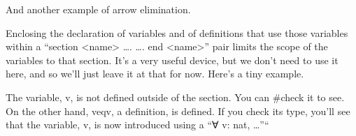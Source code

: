 \documentclass[letterpaper,10pt,english]{sphinxmanual}
\begin{document}
\begin{sphinxVerbatim}[commandchars=\\\{\}]
         
      
         
         
\end{sphinxVerbatim}

And another example of arrow elimination.

\begin{sphinxVerbatim}[commandchars=\\\{\}]
         
             
\end{sphinxVerbatim}

Enclosing the declaration of variables and of definitions that use
those variables within a “section \textless{}name\textgreater{} …. …. end \textless{}name\textgreater{}” pair
limits the scope of the variables to that section. It’s a very useful
device, but we don’t need to use it here, and so we’ll just leave it
at that for now.  Here’s a tiny example.

\begin{sphinxVerbatim}[commandchars=\\\{\}]
 
  
      
 
\end{sphinxVerbatim}

The variable, v, is not defined outside of the section. You can \#check
it to see. On the other hand, veqv, a definition, is defined. If you
check its type, you’ll see that the variable, v, is now introduced
using a “∀ v: nat, …”“
\end{document}
